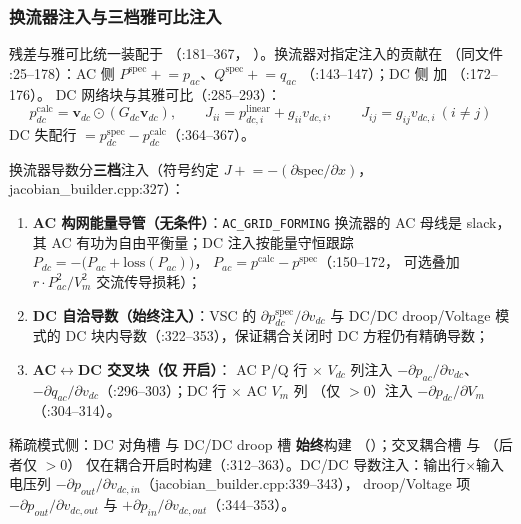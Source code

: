 \subsubsection*{换流器注入与三档雅可比注入}
残差与雅可比统一装配于 （:181--367，
）。换流器对指定注入的贡献在
（同文件 :25--178）：AC 侧
$P^{\mathrm{spec}} \mathrel{+}=p_{ac}$、$Q^{\mathrm{spec}}\mathrel{+}=q_{ac}$
（:143--147）；DC 侧  加 （:172--176）。
DC 网络块与其雅可比（:285--293）：
\[
p_{dc}^{\mathrm{calc}}=\mathbf v_{dc}\odot(G_{dc}\mathbf v_{dc}),\qquad
J_{ii}=p_{dc,i}^{\mathrm{linear}}+g_{ii}v_{dc,i},\qquad
J_{ij}=g_{ij}v_{dc,i}\ (i\neq j)
\]
DC 失配行 $=p_{dc}^{\mathrm{spec}}-p_{dc}^{\mathrm{calc}}$（:364--367）。

换流器导数分\textbf{三档}注入（符号约定 $J\mathrel{+}=-(\partial\mathrm{spec}/\partial x)$，
jacobian\_builder.cpp:327）：
\begin{enumerate}
  \item \textbf{AC 构网能量导管（无条件）}：\texttt{AC\_GRID\_FORMING} 换流器的
        AC 母线是 slack，其 AC 有功为自由平衡量；DC 注入按能量守恒跟踪
        $P_{dc}=-\big(P_{ac}+\mathrm{loss}(P_{ac})\big)$，
        $P_{ac}=p^{\mathrm{calc}}-p^{\mathrm{spec}}$（:150--172，
        可选叠加 $r\cdot P_{ac}^2/V_m^2$ 交流传导损耗）；
  \item \textbf{DC 自洽导数（始终注入）}：VSC 的
        $\partial p_{dc}^{\mathrm{spec}}/\partial v_{dc}$ 与 DC/DC droop/Voltage 模式的
        DC 块内导数（:322--353），保证耦合关闭时 DC 方程仍有精确导数；
  \item \textbf{AC$\leftrightarrow$DC 交叉块（仅  开启）}：
        AC P/Q 行 $\times$ $V_{dc}$ 列注入 $-\partial p_{ac}/\partial v_{dc}$、
        $-\partial q_{ac}/\partial v_{dc}$（:296--303）；DC 行 $\times$ AC $V_m$ 列
        （仅 $>0$）注入 $-\partial p_{dc}/\partial V_m$（:304--314）。
\end{enumerate}
稀疏模式侧：DC 对角槽  与 DC/DC droop 槽
 \textbf{始终}构建
（）；交叉耦合槽
 与 （后者仅 $>0$）
仅在耦合开启时构建（:312--363）。DC/DC 导数注入：输出行$\times$输入电压列
$-\partial p_{out}/\partial v_{dc,in}$（jacobian\_builder.cpp:339--343），
droop/Voltage 项 $-\partial p_{out}/\partial v_{dc,out}$ 与
$+\partial p_{in}/\partial v_{dc,out}$（:344--353）。

